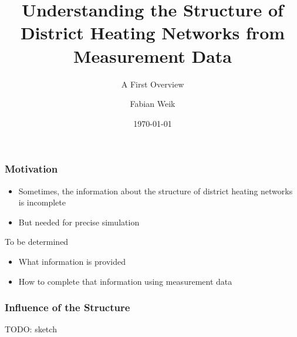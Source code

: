 \documentclass{beamer}
\title{Understanding the Structure of District Heating Networks from Measurement Data}
\subtitle{A First Overview}
\author{Fabian Weik}
\institute{Fraunhofer ITWM}
\date{\today}
\begin{document}
\frame{\titlepage}

\begin{frame}
\frametitle{Motivation}
  \begin{itemize}
    \item Sometimes, the information about the structure of district heating networks is incomplete
    \item But needed for precise simulation
  \end{itemize}

  \vspace{2em}

  To be determined
  \begin{itemize}
    \item What information is provided
    \item How to complete that information using measurement data
  \end{itemize}
\end{frame}

\begin{frame}
\frametitle{Influence of the Structure}
  TODO: sketch
\end{frame}
\end{document}
